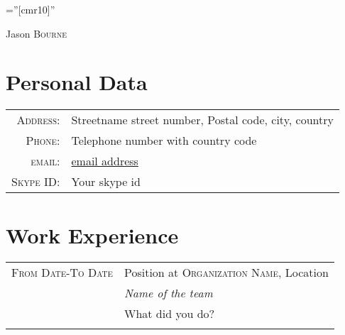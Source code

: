 



\pagestyle{empty} %

\font\fb=''[cmr10]'' %

\par{\centering
		{\Huge Jason \textsc{Bourne}
	}\bigskip\par}

\section{Personal Data}

\begin{tabular}{rl}
    \textsc{Address:}   & Streetname street number, Postal code, city, country \\
    \textsc{Phone:}     & Telephone number with country code\\
    \textsc{email:}     & \href{mailto:email address}{email address}\\
    \textsc{Skype ID:}     & Your skype id\\
\end{tabular}

\section{Work Experience}
\begin{tabular}{r|p{11cm}}
 \textsc{From Date-To Date} & Position at \textsc{Organization Name}, Location \\&\emph{Name of the team}\\&\footnotesize{What did you do?}\\\multicolumn{2}{c}{} \\
 
\end{tabular}

